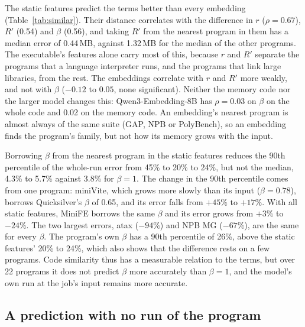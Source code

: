 \documentclass[11pt]{article}
\newcommand{\tabref}[1]{Table~\ref{#1}}
\begin{document}
The static features predict the terms better than every embedding (\tabref{tab:similar}). Their distance correlates
with the difference in $r$ ($\rho = 0.67$), $R'$ (0.54) and $\beta$ (0.56), and taking $R'$ from the nearest program
in them has a median error of 0.44\,MB, against 1.32\,MB for the median of the other programs. The executable's
features alone carry most of this, because $r$ and $R'$ separate the programs that a language interpreter runs, and
the programs that link large libraries, from the rest. The embeddings correlate with $r$ and $R'$ more weakly, and
not with $\beta$ ($-0.12$ to $0.05$, none significant). Neither the memory code nor the larger model changes this:
Qwen3-Embedding-8B has $\rho = 0.03$ on $\beta$ on the whole code and 0.02 on the memory code. An embedding's nearest program is almost always of
the same suite (GAP, NPB or PolyBench), so an embedding finds the program's family, but not how its memory grows with
the input.

Borrowing $\beta$ from the nearest program in the static features reduces the 90th percentile of the whole-run error
from 45\% to 20\% to 24\%, but not the median, 4.3\% to 5.7\% against 3.8\% for $\beta = 1$. The change in the 90th
percentile comes from one program: miniVite, which grows more slowly than its input ($\beta = 0.78$), borrows
Quicksilver's $\beta$ of 0.65, and its error falls from $+45\%$ to $+17\%$. With all static features, MiniFE borrows
the same $\beta$ and its error grows from $+3\%$ to $-24\%$. The two largest errors, atax ($-94\%$) and NPB MG
($-67\%$), are the same for every $\beta$. The program's own $\beta$
has a 90th percentile of 26\%, above the static features' 20\% to 24\%, which also shows that the difference rests
on a few programs. Code similarity thus has a measurable relation to the terms, but over 22 programs it does not
predict $\beta$ more accurately than $\beta = 1$, and the model's own run at the job's input remains more accurate.

\subsection{A prediction with no run of the program}
\end{document}
